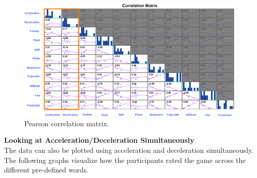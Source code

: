 




\begin{figure}[htbp]
\centering
\includegraphics[width=0.98\textwidth]{Pics/correlationMatrix_final}
\caption{Pearson correlation matrix.}
\label{fig:correlationMatrix}
\end{figure}

\textbf{Looking at Acceleration/Deceleration Simultaneously}\\
The data can also be plotted using acceleration and deceleration simultaneously. The following graphs visualize how the participants rated the game across the different pre-defined words.


